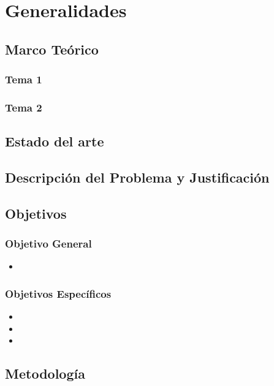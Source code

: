 \chapter{Generalidades}

\section{Marco Teórico}

\subsection{Tema 1}
\subsection{Tema 2}

\section{Estado del arte}

\section{Descripción del Problema y Justificación}

\section{Objetivos}
\subsection{Objetivo General}
\begin{itemize}
\item 
\end{itemize}

\subsection{Objetivos Específicos}
\begin{itemize}
\item 
\item 
\item 
\end{itemize}

\section{Metodología}


